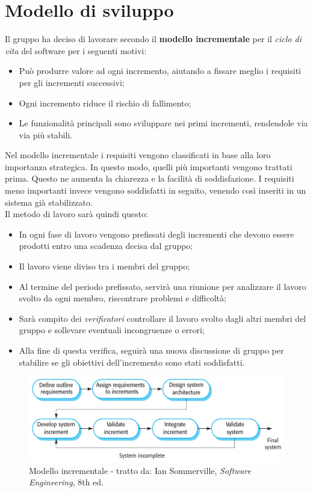\section{Modello di sviluppo} \label{section:modello_di_sviluppo}
Il gruppo ha deciso di lavorare secondo il \textbf{modello incrementale} per il \textit{ciclo di vita}\glo{} del software per i seguenti motivi:
\begin{itemize}
  \item Può produrre valore ad ogni incremento, aiutando a fissare meglio i requisiti per gli incrementi successivi;
  \item Ogni incremento riduce il rischio di fallimento;
  \item Le funzionalità principali sono sviluppare nei primi incrementi, rendendole via via più stabili.
\end{itemize}
Nel modello incrementale i requisiti vengono classificati in base alla loro importanza strategica. In questo modo, quelli più importanti vengono 
trattati prima. Questo ne aumenta la chiarezza e la facilità di soddisfazione. I requisiti meno importanti invece vengono soddisfatti in seguito, 
venendo così inseriti in un sistema già stabilizzato.\\
Il metodo di lavoro sarà quindi questo:
\begin{itemize}
  \item In ogni fase di lavoro vengono prefissati degli incrementi che devono essere prodotti entro una scadenza decisa dal gruppo;
  \item Il lavoro viene diviso tra i membri del gruppo;
  \item Al termine del periodo prefissato, servirà una riunione per analizzare il lavoro svolto da ogni membro, riscontrare problemi e difficoltà;
  \item Sarà compito dei \textit{verificatori} controllare il lavoro svolto dagli altri membri del gruppo e sollevare eventuali incongruenze o errori;
  \item Alla fine di questa verifica, seguirà una nuova discussione di gruppo per stabilire se gli obiettivi dell'incremento sono stati soddisfatti.
\end{itemize}

\begin{figure}[H]
	\centering
  \includegraphics[scale=0.6]{immagini/modello_incrementale.png}
  \caption{Modello incrementale - tratto da: Ian Sommerville, \textit{Software Engineering}, 8th ed.}
\end{figure}
\pagebreak


